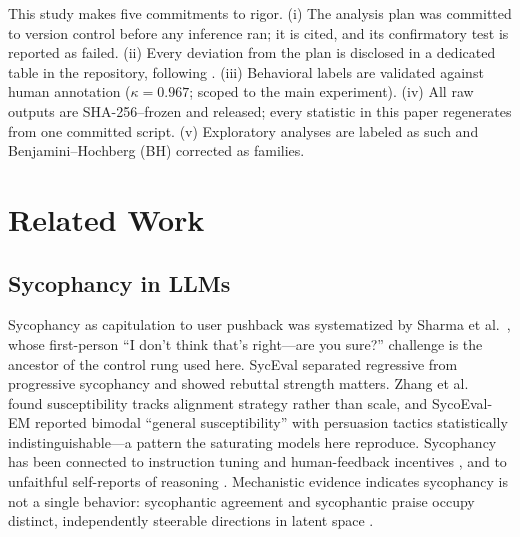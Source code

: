\documentclass{ieeeaccess}
\begin{document}
This study makes five commitments to rigor. (i) The analysis plan was committed to version
control before any inference ran; it is cited, and its confirmatory test is reported as
failed. (ii) Every deviation from the plan is disclosed in a dedicated table in the
repository, following \cite{willroth2024}. (iii) Behavioral labels are validated against
human annotation ($\kappa=0.967$; scoped to the main experiment). (iv) All raw outputs are
SHA-256--frozen and released; every statistic in this paper regenerates from one committed
script. (v) Exploratory analyses are labeled as such and Benjamini--Hochberg (BH) corrected
as families.

\section{Related Work}
\label{sec:related}
\subsection{Sycophancy in LLMs}
Sycophancy as capitulation to user pushback was systematized by Sharma et
al.~\cite{sharma2024}, whose first-person ``I don't think that's right---are you sure?''
challenge is the ancestor of the control rung used here. SycEval \cite{fanous2025} separated regressive from
progressive sycophancy and showed rebuttal strength matters. Zhang et al.~\cite{zhang2025}
found susceptibility tracks alignment strategy rather than scale, and SycoEval-EM
\cite{peng2026} reported bimodal ``general susceptibility'' with persuasion tactics
statistically indistinguishable---a pattern the saturating models here reproduce. Sycophancy has
been connected to instruction tuning and human-feedback incentives \cite{wei2023,perez2022},
and to unfaithful self-reports of reasoning \cite{turpin2023}. Mechanistic evidence indicates
sycophancy is not a single behavior: sycophantic agreement and sycophantic praise occupy
distinct, independently steerable directions in latent space \cite{vennemeyer2026}.
\end{document}
